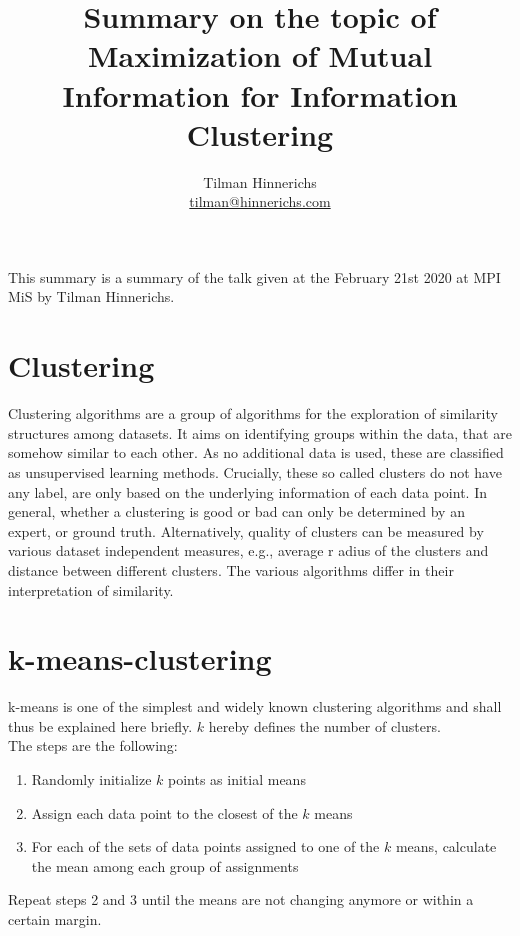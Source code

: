 \documentclass[]{article}
\title{Summary on the topic of Maximization of Mutual Information for Information Clustering}
\author{Tilman Hinnerichs\\
\href{mailto:tilman@hinnerichs.com}{tilman@hinnerichs.com}}
\begin{document}
\maketitle

This summary is a summary of the talk given at the February 21st 2020 at MPI MiS by Tilman Hinnerichs.
\section{Clustering}
Clustering algorithms are a group of algorithms for the exploration of similarity structures among datasets. It aims on identifying groups within the data, that are somehow similar to each other. As no additional data is used, these are classified as unsupervised learning methods. Crucially, these so called clusters do not have any label, are only based on the underlying information of each data point. In general, whether a clustering is good or bad can only be determined by an expert, or ground truth. Alternatively, quality of clusters can be measured by various dataset independent measures, e.g., average r adius of the clusters and distance between different clusters. The various algorithms differ in their interpretation of similarity. \\
\section{k-means-clustering}
k-means is one of the simplest and widely known clustering algorithms and shall thus be explained here briefly. $k$ hereby defines the number of clusters.\\
The steps are the following:
\begin{enumerate}
	\item Randomly initialize $k$ points as initial means 
	\item Assign each data point to the closest of the $k$ means
	\item For each of the sets of data points assigned to one of the $k$ means, calculate the mean among each group of assignments
\end{enumerate}
Repeat steps 2 and 3 until the means are not changing anymore or within a certain margin.
\end{document}
